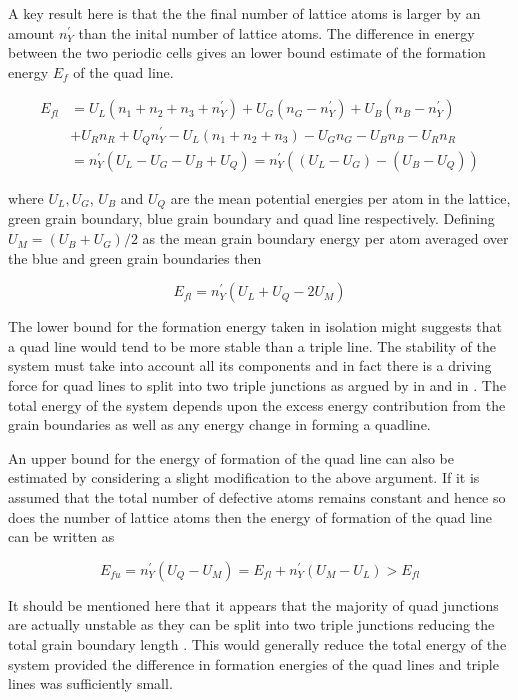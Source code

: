 \documentclass[12pt,a4paper]{book}
\begin{document}
A key result here is that the the final number of lattice atoms is larger by an amount $n_Y^{\prime}$ than the inital number of lattice atoms. The difference in energy between the two periodic cells gives an lower bound estimate of the formation energy $E_f$ of the quad line.

\begin{align*}
 E_{fl} &= U_L(n_1+n_2+n_3+n_Y^{\prime}) + U_G(n_G - n_Y^{\prime})
+ U_B(n_B - n_Y^{\prime}) \\ 
&+ U_R n_R + U_Q n_Y^{\prime}
- U_L(n_1+n_2+n_3) - U_G n_G - U_B n_B - U_R n_R  
\\ 
&=  n_Y^{\prime}(U_L - U_G - U_B + U_Q) = n_Y^{\prime}((U_L - U_G) - (U_B - U_Q)) 
\end{align*}

where $U_L, U_G$, $U_B$ and $U_Q$ are the mean potential energies per atom in the lattice, green grain boundary, blue grain boundary
and quad line respectively. Defining $U_M = (U_B + U_G)/2$ as the mean grain boundary energy per atom averaged over the blue and green grain boundaries then

\[E_{fl} =  n_Y^{\prime}(U_L + U_Q - 2U_M)\]

The lower bound for the formation energy taken in isolation might suggests that a quad line would tend to be more stable than a triple line. The stability of the system must take into account all its components and in fact there is a driving force for quad lines to split into two triple junctions as argued by \citeauthor{Lazar2011} in \cite{Lazar2011} and \citeauthor{Kinderlehrer2006} in \cite{Kinderlehrer2006}. The total energy of the system depends upon the excess energy contribution from the grain boundaries as well as any energy change in forming a quadline.


An upper bound for the energy of formation of the quad line can also be estimated by considering a slight modification to the above argument. If it is assumed that the total number of defective atoms remains constant and hence so does the number of lattice atoms then the energy of formation of the quad line can
be written as

\[E_{fu} =  n_Y^{\prime}(U_Q - U_M) = E_{fl} + n_Y^{\prime}(U_M - U_L) > E_{fl} \]

It should be mentioned here that it appears that the majority of quad junctions are actually unstable as they can be split into two triple junctions reducing the total grain boundary length \cite{Lazar2011,Kinderlehrer2006}. This would generally reduce the total energy of the system provided the difference in formation energies of the quad lines and triple lines was sufficiently small. 
\end{document}
